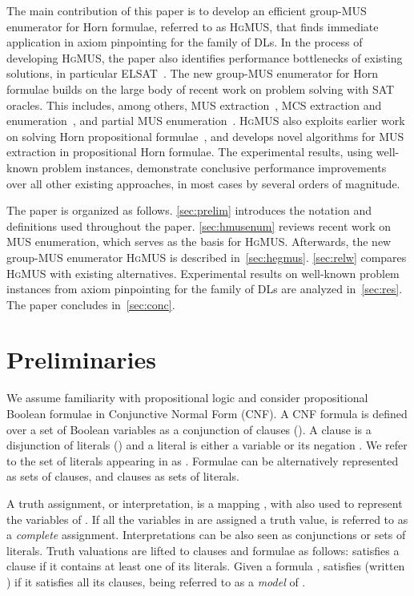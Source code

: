 \documentclass{llncs}
\newcommand{\elplain}{\xspace}
\newcommand{\hgmus}{\textsc{HgMUS}\xspace}
\newcommand{\elsat}{ELSAT\xspace}
\begin{document}
The main contribution of this paper is to develop an efficient group-MUS 
enumerator for Horn formulae, referred to as \hgmus, that finds
immediate application in axiom pinpointing for the \elplain family of
DLs.
In the process of developing \hgmus, the paper also identifies
performance bottlenecks of existing solutions, in particular
\elsat~\cite{sebastiani-cade09,sebastiani-tr15}.
The new group-MUS enumerator for Horn formulae builds on the large
body of recent work on problem solving with SAT oracles. This
includes, among others, MUS extraction~\cite{blms-aicomm12}, MCS
extraction and enumeration~\cite{mshjpb-ijcai13}, and partial MUS 
enumeration~\cite{pms-aaai13,liffiton-cpaior13,lpmms-cj15}. 
\hgmus also exploits earlier work on solving Horn propositional
formulae~\cite{gallier-jlp84,minoux-ipl88}, and develops novel
algorithms for MUS extraction in propositional Horn formulae.
The experimental results, using well-known problem instances,
demonstrate conclusive performance improvements over all other
existing approaches, in most cases by several orders of magnitude.

The paper is organized as follows. \autoref{sec:prelim} introduces the
notation and definitions used throughout the paper.
\autoref{sec:hmusenum} reviews recent work on MUS enumeration, which
serves as the basis for \hgmus. Afterwards, the new group-MUS
enumerator \hgmus is described in~\autoref{sec:hegmus}.
\autoref{sec:relw} compares \hgmus with existing alternatives.
Experimental results on well-known problem instances from axiom
pinpointing for the \elplain family of DLs are analyzed
in~\autoref{sec:res}. The paper concludes in~\autoref{sec:conc}.



\section{Preliminaries} \label{sec:prelim}

We assume familiarity with propositional logic \cite{sat-handbook09} and consider propositional Boolean formulae in Conjunctive Normal Form (CNF). 
A CNF formula  is defined over a set of Boolean variables  as a conjunction of clauses (). A clause  is a disjunction of literals () and a literal  is either a variable  or its negation . 
We refer to the set of literals appearing 
in  as . Formulae can be alternatively represented as sets of clauses, and clauses as sets of literals. 
 
A truth assignment, or interpretation, is a mapping , with  also used to represent the
variables of .
If all the variables in  are assigned a truth value,  is referred to as a \textit{complete} assignment. Interpretations can be also seen as conjunctions or sets of literals. Truth valuations are lifted to clauses and formulae as follows:  satisfies a clause  if it contains at least one of its literals. 
Given a formula ,  satisfies  (written ) if it satisfies all its clauses, being  referred to as a \textit{model} of .
\end{document}
